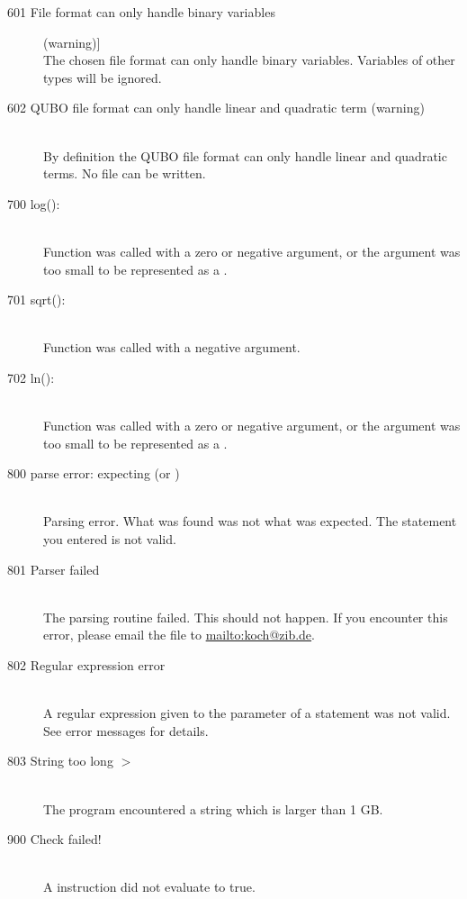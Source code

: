 \begin{description}
\item[601 File format can only handle binary variables] (warning)]\ \\
  The chosen file format can only handle binary variables. 
  Variables of other types will be ignored.
\item[602 QUBO file format can only handle linear and quadratic term
         (warning)]\ \\
  By definition the QUBO file format can only handle linear and
  quadratic terms. No file can be written.
%
%
% 
%
\item[700 log(): ]\ \\
  Function  was called with a zero or negative argument, or
the argument was too small to be represented as a .
\item[701 sqrt(): ]\ \\
  Function  was called with a negative argument.
\item[702 ln(): ]\ \\
  Function  was called with a zero or negative argument, or
  the argument was too small to be represented as a .
\item[800 parse error: expecting  (or )]\ \\
  Parsing error. What was found was not what was expected.
  The statement you entered is not valid.
\item[801 Parser failed]\ \\
  The parsing routine failed. This should not happen. If you encounter
  this error, please email the  file to \url{mailto:koch@zib.de}.
\item[802 Regular expression error]\ \\
  A regular expression given to the  parameter of a
   statement was not valid. See error messages for details.
\item[803 String too long  $>$ ]\ \\
  The program encountered a string which is larger than 1 GB. 
%
%
\item[900 Check failed!]\ \\
  A  instruction did not evaluate to true. 
\end{description}

